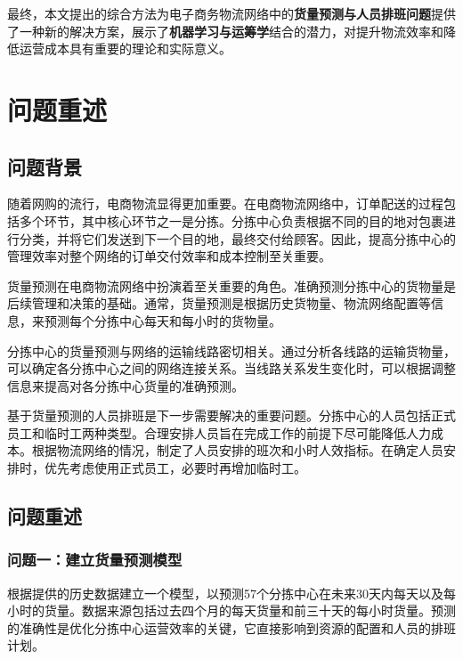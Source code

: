 \documentclass[UTF8]{article}%
\begin{document}
最终，本文提出的综合方法为电子商务物流网络中的{\bf 货量预测与人员排班问题}提供了一种新的解决方案，展示了{\bf 机器学习与运筹学}结合的潜力，对提升物流效率和降低运营成本具有重要的理论和实际意义。





\newpage

\tableofcontents


\newpage
\setcounter{page}{1}


\section{问题重述}
\subsection{问题背景}
随着网购的流行，电商物流显得更加重要。在电商物流网络中，订单配送的过程包括多个环节，其中核心环节之一是分拣。分拣中心负责根据不同的目的地对包裹进行分类，并将它们发送到下一个目的地，最终交付给顾客。因此，提高分拣中心的管理效率对整个网络的订单交付效率和成本控制至关重要。

货量预测在电商物流网络中扮演着至关重要的角色。准确预测分拣中心的货物量是后续管理和决策的基础。通常，货量预测是根据历史货物量、物流网络配置等信息，来预测每个分拣中心每天和每小时的货物量。

分拣中心的货量预测与网络的运输线路密切相关。通过分析各线路的运输货物量，可以确定各分拣中心之间的网络连接关系。当线路关系发生变化时，可以根据调整信息来提高对各分拣中心货量的准确预测。

基于货量预测的人员排班是下一步需要解决的重要问题。分拣中心的人员包括正式员工和临时工两种类型。合理安排人员旨在完成工作的前提下尽可能降低人力成本。根据物流网络的情况，制定了人员安排的班次和小时人效指标。在确定人员安排时，优先考虑使用正式员工，必要时再增加临时工。

\subsection{问题重述}
\subsubsection{问题一：建立货量预测模型}
根据提供的历史数据建立一个模型，以预测57个分拣中心在未来30天内每天以及每小时的货量。数据来源包括过去四个月的每天货量和前三十天的每小时货量。预测的准确性是优化分拣中心运营效率的关键，它直接影响到资源的配置和人员的排班计划。
\end{document}
